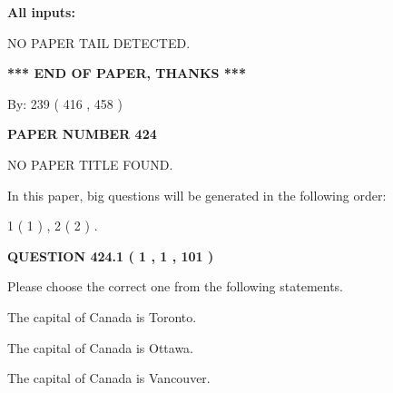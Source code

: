 \documentclass[12pt]{article}
\begin{document}
   
   
   
\noindent{}
   
   
   
   
\noindent\vspace{0.1in}\hspace{-0.08in} {\textbf{\Large{All inputs: }}}
   
   
   
   
\vspace{2.0in} NO PAPER TAIL DETECTED.
   
   
   
   
\vspace{1.0in} 
{\textbf{\large{ *** END OF PAPER, THANKS *** }}} 
   
   
\hspace{1.0in} By: 
 239 ( 416 ,  458 )
   
   
   
   
\newpage 
\setcounter{page}{ 
   424001 } 
   
   
   
   
 {\textbf{ \Large{ PAPER NUMBER  424  }}}
   
   
\vspace{0.2in}
   
   
   
   
   
   
 NO PAPER TITLE FOUND.
   
   
   
\vspace{0.2in}
   
In this paper, big questions will be generated in the following order: 
   
   
   1 ( 1 )
 ,
   2 ( 2 )
 .
  
\vspace{0.2in}
  
{\textbf{\Large{QUESTION
424.1 
 ( 1 , 1 , 101 )
}}}
  
  
Please choose the correct one from the following statements.
 
 
The capital of Canada is Toronto.
 
 
The capital of Canada is Ottawa.
 
 
The capital of Canada is Vancouver.
 
\end{document}
